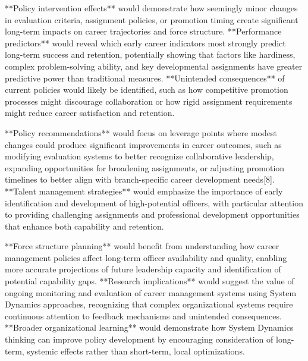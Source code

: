 \documentclass[main.tex]{subfiles}
\begin{document}
**Policy intervention effects** would demonstrate how seemingly minor changes in evaluation criteria, assignment policies, or promotion timing create significant long-term impacts on career trajectories and force structure. **Performance predictors** would reveal which early career indicators most strongly predict long-term success and retention, potentially showing that factors like hardiness, complex problem-solving ability, and key developmental assignments have greater predictive power than traditional measures. **Unintended consequences** of current policies would likely be identified, such as how competitive promotion processes might discourage collaboration or how rigid assignment requirements might reduce career satisfaction and retention.


**Policy recommendations** would focus on leverage points where modest changes could produce significant improvements in career outcomes, such as modifying evaluation systems to better recognize collaborative leadership, expanding opportunities for broadening assignments, or adjusting promotion timelines to better align with branch-specific career development needs[8]. **Talent management strategies** would emphasize the importance of early identification and development of high-potential officers, with particular attention to providing challenging assignments and professional development opportunities that enhance both capability and retention.

**Force structure planning** would benefit from understanding how career management policies affect long-term officer availability and quality, enabling more accurate projections of future leadership capacity and identification of potential capability gaps. **Research implications** would suggest the value of ongoing monitoring and evaluation of career management systems using System Dynamics approaches, recognizing that complex organizational systems require continuous attention to feedback mechanisms and unintended consequences. **Broader organizational learning** would demonstrate how System Dynamics thinking can improve policy development by encouraging consideration of long-term, systemic effects rather than short-term, local optimizations.
\end{document}
